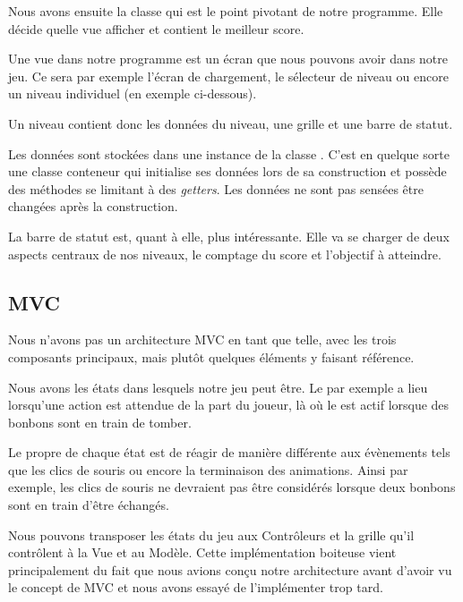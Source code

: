 \documentclass[11pt,a4paper]{article}
\newcommand{\addcode}[3]{
	\begin{figure}[H]
		\centering
		
	\end{figure}
}
\begin{document}
Nous avons ensuite la classe \verb@Game@ qui est le point
pivotant de notre programme. Elle décide quelle vue
afficher et contient le meilleur score.

Une vue dans notre programme est un écran que nous pouvons
avoir dans notre jeu. Ce sera par exemple l'écran de
chargement, le sélecteur de niveau ou encore un niveau
individuel (en exemple ci-dessous).

\addcode{code/game.hpp}{C++}{}{}

\addcode{code/view.hpp}{C++}{}{}
\addcode{code/level.hpp}{C++}{}{}

Un niveau contient donc les données du niveau, une grille
et une barre de statut.

Les données sont stockées dans une instance de la classe
\verb@LevelData@. C'est en quelque sorte une classe
conteneur qui initialise ses données lors de sa construction
et possède des méthodes se limitant à des \emph{getters}.
Les données ne sont pas sensées être changées après la
construction.

La barre de statut est, quant à elle, plus intéressante.
Elle va se charger de deux aspects centraux de nos niveaux, le
comptage du score et l'objectif à atteindre.


\subsection{MVC}

Nous n'avons pas un architecture MVC en tant que telle, avec
les trois composants principaux, mais plutôt quelques éléments y
faisant référence.

Nous avons les états dans lesquels notre jeu
peut être. Le \verb@ReadyState@ par exemple a
lieu lorsqu'une action est attendue de la part du joueur, là
où le \verb@FallState@ est actif lorsque des bonbons sont
en train de tomber.

Le propre de chaque état est de réagir de manière différente
aux évènements tels que les clics de souris ou encore la
terminaison des animations. Ainsi par exemple, les clics de souris ne devraient
pas être considérés lorsque deux bonbons sont en train
d'être échangés.

Nous pouvons transposer les états du jeu aux Contrôleurs et la
grille qu'il contrôlent à la Vue et au Modèle.
Cette implémentation boiteuse vient principalement du fait
que nous avions conçu notre architecture avant d'avoir vu le
concept de MVC et nous avons essayé de l'implémenter trop
tard.
\end{document}
